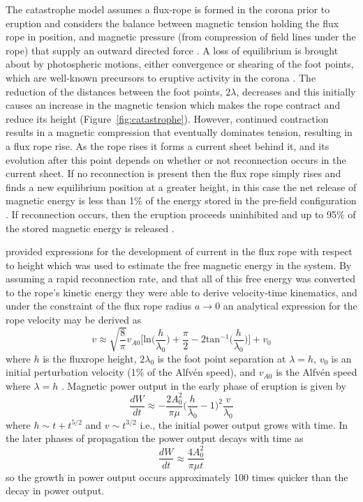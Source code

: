 The catastrophe model assumes a flux-rope is formed in the corona prior to eruption and considers the balance between magnetic tension holding the flux rope in position, and magnetic pressure (from compression of field lines under the rope) that supply an outward directed force \citep{forbes1991, lin2000, priest2000}. A loss of equilibrium is brought about by photospheric motions, either convergence or shearing of the foot points, which are well-known precursors to eruptive activity in the corona \citep{rust1972}. The reduction of the distances between the foot points, $2\lambda$, decreases and this initially 
causes an increase in the magnetic tension which makes the rope contract and reduce its height (Figure~\ref{fig:catastrophe}). However, continued contraction results in a magnetic compression that eventually dominates tension, resulting in a flux rope rise. As the rope rises it forms a current sheet behind it, and its evolution after this point depends on whether or not reconnection occurs in the current sheet. If no reconnection is present then the flux rope simply rises and finds a new equilibrium position at a greater height, in this case the net release of magnetic energy is less than 1\% of the energy stored in the pre-field configuration \citep{forbes1991}. If reconnection occurs, then the eruption proceeds uninhibited and up to 95\% of the stored magnetic energy is released \citep{forbes1995}.

\citet{forbes1995} provided expressions for the development of current in the flux rope with respect to height which was used to estimate the free magnetic energy in the system. By assuming a rapid reconnection rate, and that all of this free energy was converted to the rope's kinetic energy they were able to derive velocity-time kinematics, and under the constraint of the flux rope radius $a\rightarrow 0$ an analytical expression for the rope velocity may be derived as 
\begin{equation}
v\approx \sqrt{  \frac{8}{\pi}  }v_{A0}\bigg[\mathrm{ln}\bigg( \frac{h}{\lambda_0}\bigg) + \frac{\pi}{2}  - 2\mathrm{tan}^{-1} \bigg( \frac{h}{\lambda_0}\bigg)\bigg] + v_0
\end{equation}
where $h$ is the fluxrope height, $2\lambda_0$ is the foot point separation at $\lambda=h$, $v_0$ is an initial perturbation velocity (1\% of the Alfv\'{e}n speed), and $v_{A0}$ is the Alfv\'{e}n speed where $\lambda=h$ \citep{priest2000}. Magnetic power output in the early phase of eruption is given by
\begin{equation}
\frac{dW}{dt} \approx -\frac{2A_0^2}{\pi\mu}\bigg( \frac{h}{\lambda_0} -1\bigg)^2\frac{v}{\lambda_0}
\end{equation}
where $h\sim t + t^{5/2}$ and $v\sim t^{3/2}$ i.e., the initial power output grows with time. In the later phases of propagation the power output decays with time as
\begin{equation}
\frac{dW}{dt} \approx \frac{4A_0^2}{\pi \mu t}
\end{equation}
so the growth in power output occurs approximately 100 times quicker than the decay in power output.

